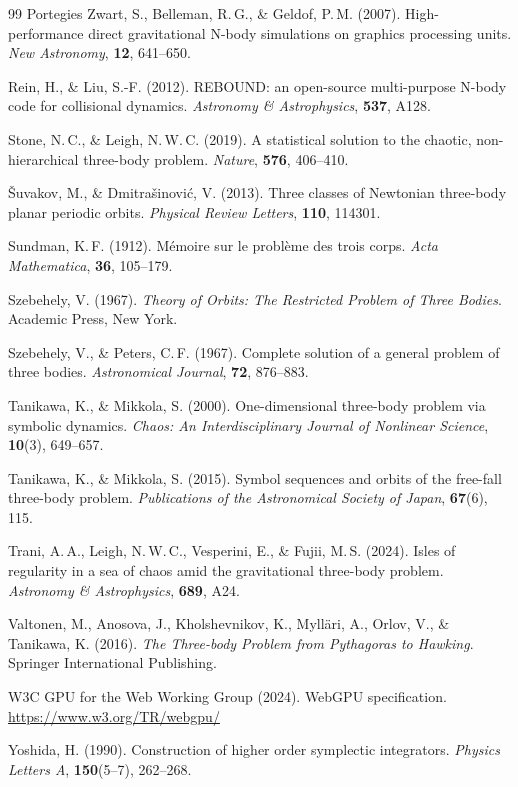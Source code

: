 \documentclass[11pt,a4paper]{article}
\begin{document}
\begin{thebibliography}{99}
Portegies Zwart, S., Belleman, R.\,G., \& Geldof, P.\,M. (2007).
High-performance direct gravitational N-body simulations on graphics processing units.
\textit{New Astronomy}, \textbf{12}, 641--650.

Rein, H., \& Liu, S.-F. (2012).
REBOUND: an open-source multi-purpose N-body code for collisional dynamics.
\textit{Astronomy \& Astrophysics}, \textbf{537}, A128.

Stone, N.\,C., \& Leigh, N.\,W.\,C. (2019).
A statistical solution to the chaotic, non-hierarchical three-body problem.
\textit{Nature}, \textbf{576}, 406--410.

{\v{S}}uvakov, M., \& Dmitra{\v{s}}inovi{\'c}, V. (2013).
Three classes of Newtonian three-body planar periodic orbits.
\textit{Physical Review Letters}, \textbf{110}, 114301.

Sundman, K.\,F. (1912).
M\'{e}moire sur le probl\`{e}me des trois corps.
\textit{Acta Mathematica}, \textbf{36}, 105--179.

Szebehely, V. (1967).
\textit{Theory of Orbits: The Restricted Problem of Three Bodies}.
Academic Press, New York.

Szebehely, V., \& Peters, C.\,F. (1967).
Complete solution of a general problem of three bodies.
\textit{Astronomical Journal}, \textbf{72}, 876--883.

Tanikawa, K., \& Mikkola, S. (2000).
One-dimensional three-body problem via symbolic dynamics.
\textit{Chaos: An Interdisciplinary Journal of Nonlinear Science}, \textbf{10}(3), 649--657.

Tanikawa, K., \& Mikkola, S. (2015).
Symbol sequences and orbits of the free-fall three-body problem.
\textit{Publications of the Astronomical Society of Japan}, \textbf{67}(6), 115.

Trani, A.\,A., Leigh, N.\,W.\,C., Vesperini, E., \& Fujii, M.\,S. (2024).
Isles of regularity in a sea of chaos amid the gravitational three-body problem.
\textit{Astronomy \& Astrophysics}, \textbf{689}, A24.

Valtonen, M., Anosova, J., Kholshevnikov, K., Myll\"{a}ri, A., Orlov, V., \& Tanikawa, K. (2016).
\textit{The Three-body Problem from Pythagoras to Hawking}.
Springer International Publishing.

W3C GPU for the Web Working Group (2024).
WebGPU specification.
\url{https://www.w3.org/TR/webgpu/}

Yoshida, H. (1990).
Construction of higher order symplectic integrators.
\textit{Physics Letters A}, \textbf{150}(5--7), 262--268.

\end{thebibliography}
\end{document}
